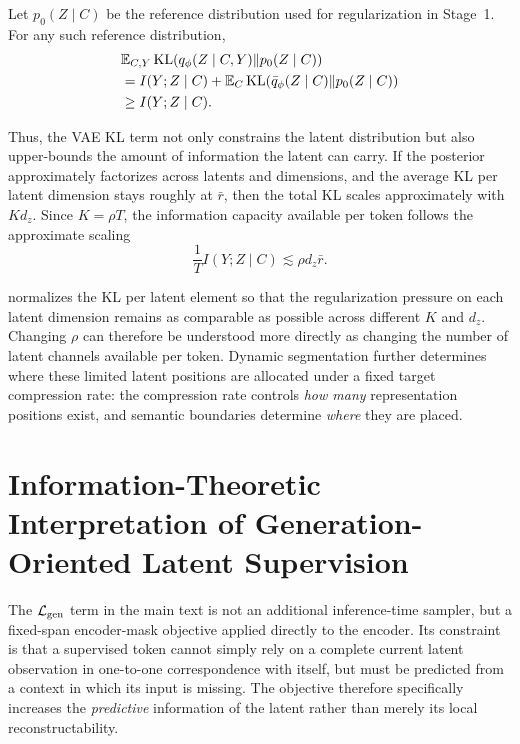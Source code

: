Let $p_0(Z\mid C)$ be the reference distribution used for regularization in Stage~1. For any such reference distribution,
\begin{equation}
\begin{aligned}
&\mathbb{E}_{C,Y}\operatorname{KL}\!\left(q_\phi(Z\mid C,Y)\|p_0(Z\mid C)\right)\\
&=I(Y;Z\mid C)
+\mathbb{E}_C\operatorname{KL}\!\left(\bar q_\phi(Z\mid C)\|p_0(Z\mid C)\right)\\
&\ge I(Y;Z\mid C).
\end{aligned}
\label{eq:app-kl-upper}
\end{equation}

Thus, the VAE KL term not only constrains the latent distribution but also upper-bounds the amount of information the latent can carry. If the posterior approximately factorizes across latents and dimensions, and the average KL per latent dimension stays roughly at $\bar r$, then the total KL scales approximately with $K d_z$. Since $K=\rho T$, the information capacity available per token follows the approximate scaling
\begin{equation}
    \frac{1}{T}I(Y;Z\mid C)
    \lesssim
    \rho d_z\bar r.
    \label{eq:app-rho-capacity}
\end{equation}

\method normalizes the KL per latent element so that the regularization pressure on each latent dimension remains as comparable as possible across different $K$ and $d_z$. Changing $\rho$ can therefore be understood more directly as changing the number of latent channels available per token. Dynamic segmentation further determines where these limited latent positions are allocated under a fixed target compression rate: the compression rate controls \emph{how many} representation positions exist, and semantic boundaries determine \emph{where} they are placed.

\section{Information-Theoretic Interpretation of Generation-Oriented Latent Supervision}
\label{app:semantic}

The $\mathcal{L}_{\mathrm{gen}}$ term in the main text is not an additional inference-time sampler, but a fixed-span encoder-mask objective applied directly to the encoder. Its constraint is that a supervised token cannot simply rely on a complete current latent observation in one-to-one correspondence with itself, but must be predicted from a context in which its input is missing. The objective therefore specifically increases the \emph{predictive} information of the latent rather than merely its local reconstructability.

